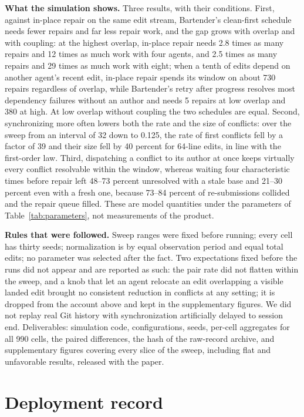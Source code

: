 \documentclass[pdflatex,sn-mathphys-ay]{sn-jnl}
\theoremstyle{thmstyleone}
\theoremstyle{thmstylethree}
\begin{document}
\textbf{What the simulation shows.} Three results, with their conditions. First, against in-place repair on the same edit stream, Bartender's clean-first schedule needs fewer repairs and far less repair work, and the gap grows with overlap and with coupling: at the highest overlap, in-place repair needs 2.8 times as many repairs and 12 times as much work with four agents, and 2.5 times as many repairs and 29 times as much work with eight; when a tenth of edits depend on another agent's recent edit, in-place repair spends its window on about 730 repairs regardless of overlap, while Bartender's retry after progress resolves most dependency failures without an author and needs 5 repairs at low overlap and 380 at high. At low overlap without coupling the two schedules are equal. Second, synchronizing more often lowers both the rate and the size of conflicts: over the sweep from an interval of 32 down to 0.125, the rate of first conflicts fell by a factor of 39 and their size fell by 40 percent for 64-line edits, in line with the first-order law. Third, dispatching a conflict to its author at once keeps virtually every conflict resolvable within the window, whereas waiting four characteristic times before repair left 48--73 percent unresolved with a stale base and 21--30 percent even with a fresh one, because 73--84 percent of re-submissions collided and the repair queue filled. These are model quantities under the parameters of Table~\ref{tab:parameters}, not measurements of the product.

\textbf{Rules that were followed.} Sweep ranges were fixed before running; every cell has thirty seeds; normalization is by equal observation period and equal total edits; no parameter was selected after the fact. Two expectations fixed before the runs did not appear and are reported as such: the pair rate did not flatten within the sweep, and a knob that let an agent relocate an edit overlapping a visible landed edit brought no consistent reduction in conflicts at any setting; it is dropped from the account above and kept in the supplementary figures. We did not replay real Git history with synchronization artificially delayed to session end. Deliverables: simulation code, configurations, seeds, per-cell aggregates for all 990 cells, the paired differences, the hash of the raw-record archive, and supplementary figures covering every slice of the sweep, including flat and unfavorable results, released with the paper.
\section{Deployment record}\label{sec:deployment}
\end{document}
